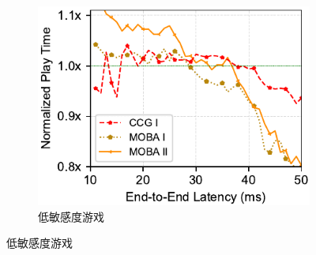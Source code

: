 \begin{figure}[htbp]
\begin{subfigure}[t]{0.33\linewidth}
  \centering
  \includegraphics[width=\linewidth]{figures/chap03/measurement_data/delay-not-sensitive.pdf}
  \caption{低敏感度游戏}
  \label{fig-real-measurement-results-Low-Delay-Sensitivity-Games}
\end{subfigure}%
\label{fig:measurement-result}
\end{figure}
